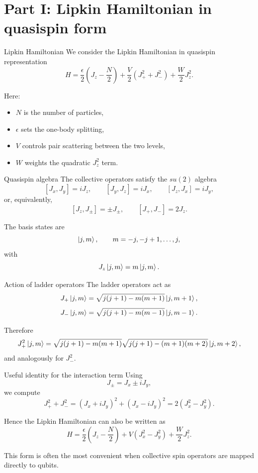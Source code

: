 \documentclass[aspectratio=169]{beamer}
\begin{document}
\section{Part I: Lipkin Hamiltonian in quasispin form}

\begin{frame}{Lipkin Hamiltonian}
We consider the Lipkin Hamiltonian in quasispin representation
\[
H
=
\frac{\epsilon}{2}\left(J_z-\frac{N}{2}\right)
+
\frac{V}{2}\left(J_+^2+J_-^2\right)
+
\frac{W}{2}J_z^2.
\]

Here:
\begin{itemize}
\item \(N\) is the number of particles,
\item \(\epsilon\) sets the one-body splitting,
\item \(V\) controls pair scattering between the two levels,
\item \(W\) weights the quadratic \(J_z^2\) term.
\end{itemize}
\end{frame}

\begin{frame}{Quasispin algebra}
The collective operators satisfy the \(su(2)\) algebra
\[
[J_x,J_y]=iJ_z,\qquad
[J_y,J_z]=iJ_x,\qquad
[J_z,J_x]=iJ_y,
\]
or, equivalently,
\[
[J_z,J_\pm]=\pm J_\pm,
\qquad
[J_+,J_-]=2J_z.
\]

The basis states are
\[
\ket{j,m},
\qquad
m=-j,-j+1,\dots,j,
\]
with
\[
J_z\ket{j,m}=m\ket{j,m}.
\]
\end{frame}

\begin{frame}{Action of ladder operators}
The ladder operators act as
\[
J_+\ket{j,m}
=
\sqrt{j(j+1)-m(m+1)}\ket{j,m+1},
\]
\[
J_-\ket{j,m}
=
\sqrt{j(j+1)-m(m-1)}\ket{j,m-1}.
\]

Therefore
\[
J_+^2\ket{j,m}
=
\sqrt{j(j+1)-m(m+1)}
\sqrt{j(j+1)-(m+1)(m+2)}
\ket{j,m+2},
\]
and analogously for \(J_-^2\).
\end{frame}

\begin{frame}{Useful identity for the interaction term}
Using
\[
J_\pm = J_x \pm iJ_y,
\]
we compute
\[
J_+^2 + J_-^2
=
(J_x+iJ_y)^2 + (J_x-iJ_y)^2
=
2(J_x^2-J_y^2).
\]

Hence the Lipkin Hamiltonian can also be written as
\[
H
=
\frac{\epsilon}{2}\left(J_z-\frac{N}{2}\right)
+
V(J_x^2-J_y^2)
+
\frac{W}{2}J_z^2.
\]

This form is often the most convenient when collective spin operators are mapped directly to qubits.
\end{frame}
\end{document}
